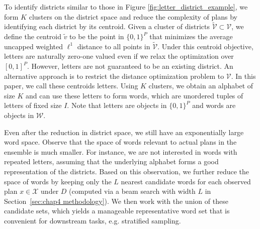 \FloatBarrier
To identify districts similar to those in Figure \ref{fig:letter_district_example}, we form $K$ clusters on the district space and reduce the complexity of plans by identifying each district by its centroid.
Given a cluster of districts $\tilde{\mathcal{V}}\subset \mathcal{V}$, we define the centroid $\tilde v$ to be the point in $\{0,1\}^P$ that minimizes the average uncapped weighted $\ell^1$ distance to all points in $\tilde{\mathcal{V}}$.
Under this centroid objective, letters are naturally zero-one valued even if we relax the optimization over $[0,1]^P$.
However, letters are not guaranteed to be an existing district.
An alternative approach is to restrict the distance optimization problem to $\mathcal{V}$.
In this paper, we call these centroids letters.
Using $K$ clusters, we obtain an alphabet of size $K$ and can use these letters to form words, which are unordered tuples of letters of fixed size $I$.
Note that letters are objects in $\{0,1\}^P$ and words are objects in $\mathcal{W}$.

Even after the reduction in district space, we still have an exponentially large word space.
Observe that the space of words relevant to actual plans in the ensemble is much smaller.
For instance, we are not interested in words with repeated letters, assuming that the underlying alphabet forms a good representation of the districts.
Based on this observation, we further reduce the space of words by keeping only the $L$ nearest candidate words for each observed plan $x\in\mathcal{X}$ under $D$ (computed via a beam search with width $L$ in Section~\ref{sec:chap4 methodology}).
We then work with the union of these candidate sets, which yields a manageable representative word set that is convenient for downstream tasks, e.g. stratified sampling.

